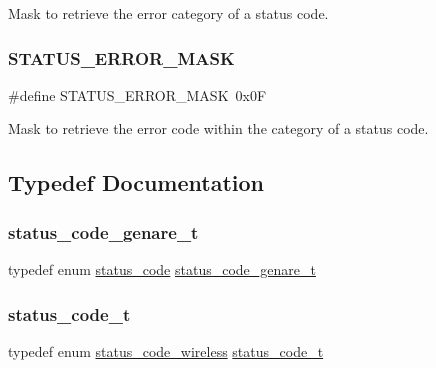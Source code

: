 Mask to retrieve the error category of a status code. \mbox{\label{group__group__sam0__utils__status__codes_ga4c46d8f176ca46ab775db0fe270d2f98}} 
\subsubsection{\texorpdfstring{STATUS\_ERROR\_MASK}{STATUS\_ERROR\_MASK}}
{\footnotesize\ttfamily \#define S\+T\+A\+T\+U\+S\+\_\+\+E\+R\+R\+O\+R\+\_\+\+M\+A\+SK~0x0F}

Mask to retrieve the error code within the category of a status code. 

\subsection{Typedef Documentation}
\mbox{\label{group__group__sam0__utils__status__codes_gac00c8566f7cf35542ab21a113933f485}} 
\subsubsection{\texorpdfstring{status\_code\_genare\_t}{status\_code\_genare\_t}}
{\footnotesize\ttfamily typedef enum \mbox{\hyperlink{group__group__sam0__utils__status__codes_ga751c892e5a46b8e7d282085a5a5bf151}{status\+\_\+code}} \mbox{\hyperlink{group__group__sam0__utils__status__codes_gac00c8566f7cf35542ab21a113933f485}{status\+\_\+code\+\_\+genare\+\_\+t}}}

\mbox{\label{group__group__sam0__utils__status__codes_ga68396b4d6dda8fc779819385588e4853}} 
\subsubsection{\texorpdfstring{status\_code\_t}{status\_code\_t}}
{\footnotesize\ttfamily typedef enum \mbox{\hyperlink{group__group__sam0__utils__status__codes_ga29235ed38b6f02861f29daae665ac3a2}{status\+\_\+code\+\_\+wireless}} \mbox{\hyperlink{group__group__sam0__utils__status__codes_ga68396b4d6dda8fc779819385588e4853}{status\+\_\+code\+\_\+t}}}



